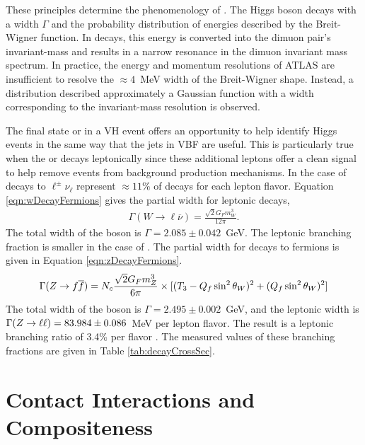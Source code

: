 These principles determine the phenomenology of \hmm.
The Higgs boson decays with a width $\Gamma$ and the probability distribution of energies described by the Breit-Wigner function.
In \hmm decays, this energy is converted into the dimuon pair's invariant-mass and results in a narrow resonance in the dimuon invariant mass spectrum.
In practice, the energy and momentum resolutions of ATLAS are insufficient to resolve the $\approx4$~MeV width of the Breit-Wigner shape.
Instead, a distribution described approximately a Gaussian function with a width corresponding to the invariant-mass resolution is observed.

The final state \W or \Z in a VH event offers an opportunity to help identify Higgs events in the same way that the jets in VBF are useful.
This is particularly true when the \W or \Z decays leptonically since these additional leptons offer a clean signal to help remove events from background production mechanisms.
In the case of \W decays to $\ell^\pm\nu_\ell$ represent $\approx11\%$ of decays for each lepton flavor.
Equation \ref{eqn:wDecayFermions} gives the partial width for leptonic \W decays,
\begin{equation}\begin{split}\label{eqn:wDecayFermions}
    \Gamma(W\to\ell\overline{\nu})=\frac{\sqrt{2}G_Fm_W^3}{12\pi}.
\end{split}\end{equation} 
The total width of the \W boson is $\Gamma=2.085\pm0.042$~GeV.
The leptonic branching fraction is smaller in the case of \Z.
The partial width for \Z decays to fermions is given in Equation \ref{eqn:zDecayFermions}.
\begin{equation}\begin{split}\label{eqn:zDecayFermions}
    \Gamma(Z\to f\overline{f})=N_c\frac{\sqrt{2}G_Fm_Z^3}{6\pi}\times[(T_3-Q_f\sin^2\theta_W)^2+(Q_f\sin^2\theta_W)^2]
\end{split}\end{equation} 
The total width of the \Z boson is $\Gamma=2.495\pm0.002$~GeV, and the leptonic width is $\Gamma(Z\to\ell\ell)=83.984\pm0.086$~MeV per lepton flavor.
The result is a leptonic branching ratio of 3.4\% per flavor \cite{pdg2018}.
The measured values of these branching fractions are given in Table \ref{tab:decayCrossSec}.

\section{Contact Interactions and Compositeness}

